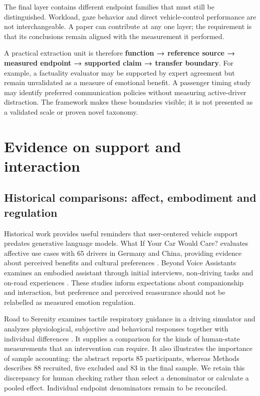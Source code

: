 \documentclass[11pt,a4paper]{article}
\begin{document}
The final layer contains different endpoint families that must still be
distinguished. Workload, gaze behavior and direct vehicle-control
performance are not interchangeable. A paper can contribute at any one
layer; the requirement is that its conclusions remain aligned with the
measurement it performed.

A practical extraction unit is therefore \textbf{function → reference
source → measured endpoint → supported claim → transfer boundary}. For
example, a factuality evaluator may be supported by expert agreement but
remain unvalidated as a measure of emotional benefit. A passenger timing
study may identify preferred communication policies without measuring
active-driver distraction. The framework makes these boundaries visible;
it is not presented as a validated scale or proven novel taxonomy.

\section{Evidence on support and
interaction}\label{evidence-on-support-and-interaction}

\subsection{Historical comparisons: affect, embodiment and
regulation}\label{historical-comparisons-affect-embodiment-and-regulation}

Historical work provides useful reminders that user-centered vehicle
support predates generative language models. What If Your Car Would
Care? evaluates affective use cases with 65 drivers in Germany and
China, providing evidence about perceived benefits and cultural
preferences \citep{S1}. Beyond Voice Assistants examines an embodied
assistant through initial interviews, non-driving tasks and on-road
experiences \citep{S3}. These studies inform expectations about
companionship and interaction, but preference and perceived reassurance
should not be relabelled as measured emotion regulation.

Road to Serenity examines tactile respiratory guidance in a driving
simulator and analyzes physiological, subjective and behavioral
responses together with individual differences \citep{S2}. It supplies a
comparison for the kinds of human-state measurements that an
intervention can require. It also illustrates the importance of sample
accounting: the abstract reports 85 participants, whereas Methods
describes 88 recruited, five excluded and 83 in the final sample. We
retain this discrepancy for human checking rather than select a
denominator or calculate a pooled effect. Individual endpoint
denominators remain to be reconciled.
\end{document}
